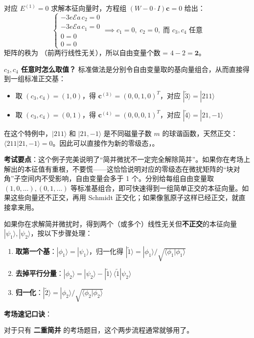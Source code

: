 \begin{modelbox}
对应 $E^{(1)} = 0$ 求解本征向量时，方程组 $(W - 0 \cdot I)\mathbf{c} = 0$ 给出：
\[
\begin{cases}
-3e\mathcal{E}a \, c_2 = 0 \\
-3e\mathcal{E}a \, c_1 = 0 \\
0 = 0 \\
0 = 0
\end{cases}
\implies c_1 = 0, \; c_2 = 0, \; \text{而 } c_3, c_4 \text{ 任意}
\]
矩阵的秩为 （前两行线性无关），所以自由变量个数 = $4 - 2 = \mathbf{2}$。

\textbf{$c_3, c_4$ 任意时怎么取值？} 标准做法是分别令自由变量取的基向量组合，从而直接得到一组标准正交基：
\begin{itemize}[nosep]
    \item 取 $(c_3, c_4) = (1, 0)$，得 $\mathbf{c}^{(3)} = (0, 0, 1, 0)^T$，对应 $|\tilde{3}\rangle = |211\rangle$
    \item 取 $(c_3, c_4) = (0, 1)$，得 $\mathbf{c}^{(4)} = (0, 0, 0, 1)^T$，对应 $|\tilde{4}\rangle = |21,-1\rangle$
\end{itemize}

在这个特例中，$|211\rangle$ 和 $|21,-1\rangle$ 是不同磁量子数 $m$ 的球谐函数，天然正交：$\langle 211|21,-1\rangle = 0$。因此可以直接作为新的零级态，。

\textbf{考试要点}：这个例子完美说明了``简并微扰不一定完全解除简并''。如果你在考场上解出的本征值有重根，不要慌——这恰恰说明对应的零级态在微扰矩阵的``块对角''子空间内不受影响，自由变量会多于 1 个。分别给每组自由变量取 $(1,0,\dots), (0,1,\dots)$ 等标准基组合，即可快速得到一组简单正交的本征向量。如果这些向量还不正交，再用 Schmidt 正交化；如果像氢原子这样已经正交，就直接拿来用。
\end{modelbox}

\begin{tipbox}
如果你在求解简并微扰时，得到两个（或多个）线性无关但\textbf{不正交}的本征向量 $|\psi_1\rangle, |\psi_2\rangle$，按以下步骤处理：
\begin{enumerate}[nosep]
    \item \textbf{取第一个基}：$|\phi_1\rangle = |\psi_1\rangle$，归一化得 $|\tilde{1}\rangle = |\phi_1\rangle / \sqrt{\langle\phi_1|\phi_1\rangle}$
    \item \textbf{去掉平行分量}：$|\phi_2\rangle = |\psi_2\rangle - |\tilde{1}\rangle \, \langle\tilde{1}|\psi_2\rangle$
    \item \textbf{归一化}：$|\tilde{2}\rangle = |\phi_2\rangle / \sqrt{\langle\phi_2|\phi_2\rangle}$
\end{enumerate}

\textbf{考场速记口诀}：
\begin{center}
\end{center}

对于只有 \textbf{二重简并} 的考场题目，这个两步流程通常就够用了。
\end{tipbox}

